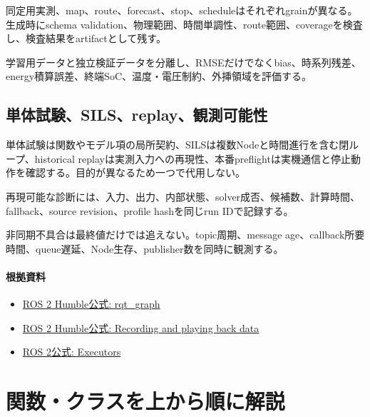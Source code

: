 \documentclass[a4paper,11pt]{article}
\begin{document}
同定用実測、map、route、forecast、stop、scheduleはそれぞれgrainが異なる。生成時にschema validation、物理範囲、時間単調性、route範囲、coverageを検査し、検査結果をartifactとして残す。


学習用データと独立検証データを分離し、RMSEだけでなくbias、時系列残差、energy積算誤差、終端SoC、温度・電圧制約、外挿領域を評価する。



\subsection{単体試験、SILS、replay、観測可能性}
単体試験は関数やモデル項の局所契約、SILSは複数Nodeと時間進行を含む閉ループ、historical replayは実測入力への再現性、本番preflightは実機通信と停止動作を確認する。目的が異なるため一つで代用しない。


再現可能な診断には、入力、出力、内部状態、solver成否、候補数、計算時間、fallback、source revision、profile hashを同じrun IDで記録する。


非同期不具合は最終値だけでは追えない。topic周期、message age、callback所要時間、queue遅延、Node生存、publisher数を同時に観測する。

\paragraph{根拠資料}
\begin{itemize}[leftmargin=1.6em]
\item \href{https://docs.ros.org/en/ros2_packages/humble/api/rqt_graph/index.html}{ROS 2 Humble公式: rqt\_graph}
\item \href{https://docs.ros.org/en/humble/Tutorials/Beginner-CLI-Tools/Recording-And-Playing-Back-Data/Recording-And-Playing-Back-Data.html}{ROS 2 Humble公式: Recording and playing back data}
\item \href{https://docs.ros.org/en/rolling/Concepts/Intermediate/About-Executors.html}{ROS 2公式: Executors}
\end{itemize}



        \section{関数・クラスを上から順に解説}
\end{document}
